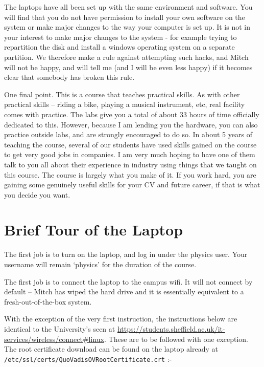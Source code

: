 \documentclass[../physical_computing.tex]{subfiles}
\begin{document}
The laptops have all been set up with the same environment and software. You will find that you do not have permission to install your own software on the system or make major changes to the way your computer is set up. It is not in your interest to make major changes to the system -  for example trying to repartition the disk and install a windows operating system on a separate partition. We therefore make a rule against attempting such hacks, and Mitch will not be happy, and will tell me (and I will be even less happy) if it becomes clear that somebody has broken this rule. 

One final point. This is a course that teaches practical skills. As with other practical skills – riding a bike, playing a musical instrument, etc, real facility comes with practice. The labs give you a total of about 33 hours of time officially dedicated to this. However, because I am lending you the hardware, you can also practice outside labs, and are strongly encouraged to do so. In about 5 years of teaching the course, several of our students have used skills gained on the course to get very good jobs in companies. I am very much hoping to have one of them talk to you all about their experience in industry using things that we taught on this course. The course is largely what you make of it. If you work hard, you are gaining some genuinely useful skills for your CV and future career, if that is what you decide you want.

\section{Brief Tour of the Laptop}
\label{sec:brieftour}

The first job is to turn on the laptop, and log in under the physics user. Your username will remain ‘physics’ for the duration of the course.

The first job is to connect the laptop to the campus wifi. It will not connect by default – Mitch has wiped the hard drive and it is essentially equivalent to a fresh-out-of-the-box system. 

With the exception of the very first instruction, the instructions below are identical to the University’s seen at \url{https://students.sheffield.ac.uk/it-services/wireless/connect#linux}. These are to be followed with one exception. The root certificate download can be found on the laptop already at \\ \texttt{/etc/ssl/certs/QuoVadisOVRootCertificate.crt} :-
\end{document}
